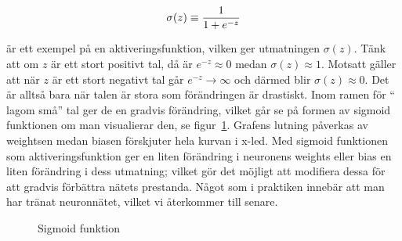 \begin{equation} \label{eq:sigmoid}
	\sigma(z) \equiv \frac{1}{1 + e^{-z}} \\
\end{equation}

är ett exempel på en aktiveringsfunktion, vilken ger utmatningen
$\sigma(%
z)$.
Tänk att om $z$ är ett stort positivt tal, då är $e^{-z} \approx 0 $ medan
$\sigma(z) \approx 1$.
Motsatt gäller att när $z$ är ett stort negativt tal går $e^{-z} \rightarrow
\infty $ och därmed blir $\sigma(z) \approx 0$. Det är alltså bara när talen är
stora som förändringen är drastiskt. Inom ramen för `` lagom små'' tal ger de en
gradvis förändring, vilket går se på formen av sigmoid funktionen om man
visualierar den, se figur~\ref{fig:sigmoidfunction}. Grafens lutning påverkas av
weightsen medan biasen förskjuter hela kurvan i x-led.
Med sigmoid funktionen som aktiveringsfunktion ger en liten förändring i
neuronens weights eller bias en liten förändring i dess utmatning; vilket gör
det möjligt att modifiera dessa för att gradvis förbättra nätets prestanda.
Något som i praktiken innebär att man har tränat neuronnätet, vilket vi
återkommer till senare.


\begin{figure}
	\centering
	\caption{Sigmoid funktion}
	\label{fig:sigmoidfunction}
\end{figure}

